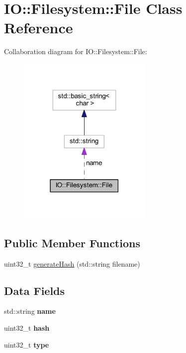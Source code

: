 \hypertarget{class_i_o_1_1_filesystem_1_1_file}{}\section{IO\+:\+:Filesystem\+:\+:File Class Reference}
\label{class_i_o_1_1_filesystem_1_1_file}


Collaboration diagram for IO\+:\+:Filesystem\+:\+:File\+:
\nopagebreak
\begin{figure}[H]
\begin{center}
\leavevmode
\includegraphics[width=182pt]{class_i_o_1_1_filesystem_1_1_file__coll__graph}
\end{center}
\end{figure}
\subsection*{Public Member Functions}
\begin{DoxyCompactItemize}
\item 
uint32\+\_\+t \hyperlink{class_i_o_1_1_filesystem_1_1_file_a162b7a834aa2880ffb57e64b61dafa62}{generate\+Hash} (std\+::string filename)
\end{DoxyCompactItemize}
\subsection*{Data Fields}
\begin{DoxyCompactItemize}
\item 
std\+::string {\bfseries name}\hypertarget{class_i_o_1_1_filesystem_1_1_file_a86d7c0717bd76958de8d105512c0920c}{}\label{class_i_o_1_1_filesystem_1_1_file_a86d7c0717bd76958de8d105512c0920c}

\item 
uint32\+\_\+t {\bfseries hash}\hypertarget{class_i_o_1_1_filesystem_1_1_file_aad4382da3abd369b7bf95ec45df02bf1}{}\label{class_i_o_1_1_filesystem_1_1_file_aad4382da3abd369b7bf95ec45df02bf1}

\item 
uint32\+\_\+t {\bfseries type}\hypertarget{class_i_o_1_1_filesystem_1_1_file_aa65b54894d2b1626619c0921bb8c957a}{}\label{class_i_o_1_1_filesystem_1_1_file_aa65b54894d2b1626619c0921bb8c957a}

\end{DoxyCompactItemize}


